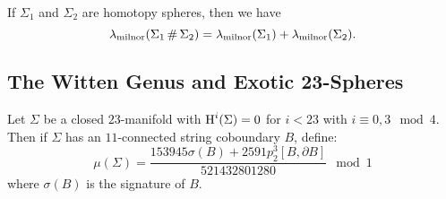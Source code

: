 \begin{proposition}
	If $\Sigma_1$ and $\Sigma_2$ are homotopy spheres, then we have \[\lambda_{\mathrm{milnor}}(\Sigma_1\,\#\,\Sigma_2) = \lambda_{\mathrm{milnor}}(\Sigma_1) + \lambda_{\mathrm{milnor}}(\Sigma_2).\]
\end{proposition}


\subsection{The Witten Genus and Exotic $\mathbf{23}$-Spheres}
\begin{definition*}
	Let $\Sigma$ be a closed $23$-manifold with $\operatorname{H}^i(\Sigma)=0$ for $i<23$ with $i\equiv 0,3\mod 4$. Then if $\Sigma$ has an $11$-connected string coboundary $B$, define:
	\[
		\mu(\Sigma) = \frac{153945\sigma(B) + 2591p_2^3[B, \partial B]}{521432801280}\mod 1
	\]
	where $\sigma(B)$ is the signature of $B$.
\end{definition*}

